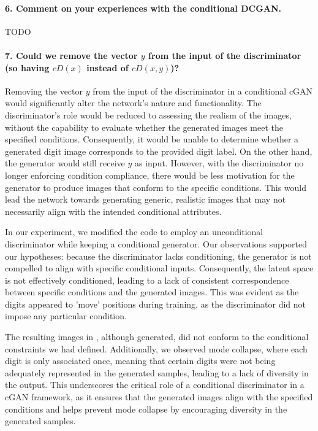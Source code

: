 \paragraph*{6. Comment on your experiences with the conditional DCGAN.}

TODO


\paragraph*{7. Could we remove the vector $y$ from the input of the discriminator (so having $cD(x)$ instead of $cD(x, y)$)?}

Removing the vector $y$ from the input of the discriminator in a conditional cGAN would significantly alter the network's nature and functionality. The discriminator's role would be reduced to assessing the realism of the images, without the capability to evaluate whether the generated images meet the specified conditions. Consequently, it would be unable to determine whether a generated digit image corresponds to the provided digit label. On the other hand, the generator would still receive $y$ as input. However, with the discriminator no longer enforcing condition compliance, there would be less motivation for the generator to produce images that conform to the specific conditions. This would lead the network towards generating generic, realistic images that may not necessarily align with the intended conditional attributes.

In our experiment, we modified the code to employ an unconditional discriminator while keeping a conditional generator. Our observations supported our hypotheses: because the discriminator lacks conditioning, the generator is not compelled to align with specific conditional inputs. Consequently, the latent space is not effectively conditioned, leading to a lack of consistent correspondence between specific conditions and the generated images. This was evident as the digits appeared to 'move' positions during training, as the discriminator did not impose any particular condition.

The resulting images in , although generated, did not conform to the conditional constraints we had defined.  Additionally, we observed mode collapse, where each digit is only associated once, meaning that certain digits were not being adequately represented in the generated samples, leading to a lack of diversity in the output. This underscores the critical role of a conditional discriminator in a cGAN framework, as it ensures that the generated images align with the specified conditions and helps prevent mode collapse by encouraging diversity in the generated samples.


